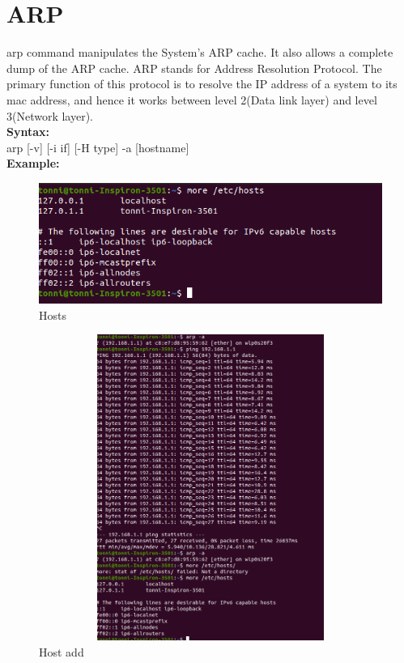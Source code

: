 \documentclass[11pt]{article}
\begin{document}
\section{ARP}
arp command manipulates the System’s ARP cache. It also allows a complete dump of the ARP cache. ARP stands for Address Resolution Protocol. The primary function of this protocol is to resolve the IP address of a system to its mac address, and hence it works between level 2(Data link layer) and level 3(Network layer). \\[12pt]
\textbf{Syntax:\\[12pt]}
arp [-v] [-i if] [-H type] -a [hostname]\\[12pt]
\textbf{Example:\\[12pt]}
  \begin{figure}[!h]
\centering
\includegraphics[width=\textwidth]{hosts.png}
\caption{Hosts}
\end{figure}
  \begin{figure}[!h]
\centering
\includegraphics[width=12cm,height=10cm,keepaspectratio]{add_hosts.png}
\caption{Host add}
\end{figure}
\end{document}
